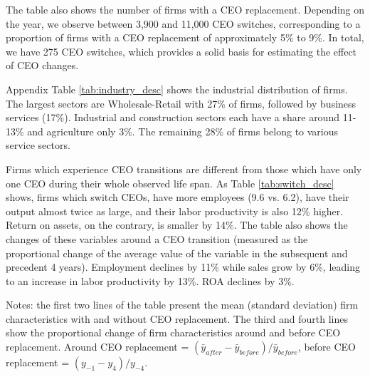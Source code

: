 \documentclass[sigconf,nonacm]{acmart}
\newcommand{\tablepath}{papers/econometrics/table}
\begin{document}
The table also shows the number of firms with a CEO replacement. Depending on the year, we observe between 3,900 and 11,000 CEO switches, corresponding to a proportion of firms with a CEO replacement of approximately 5\% to 9\%. In total, we have 275 CEO switches, which provides a solid basis for estimating the effect of CEO changes.

Appendix Table \ref{tab:industry_desc} shows the industrial distribution of firms. The largest sectors are Wholesale-Retail with 27\% of firms, followed by business services (17\%).  Industrial and construction sectors each have a share around 11-13\% and agriculture only 3\%. The remaining 28\% of firms belong to various service sectors.

Firms which experience CEO transitions are different from those which have only one CEO during their whole observed life span. As Table \ref{tab:switch_desc} shows, firms which switch CEOs, have more employees (9.6 vs. 6.2), have their output almost twice as large, and their labor productivity is also 12\% higher. Return on assets, on the contrary, is smaller by 14\%. The table also shows the changes of these variables around a CEO transition (measured as the proportional change of the average value of the variable in the subsequent and precedent 4 years). Employment declines by 11\% while sales grow by 6\%, leading to an increase in labor productivity by 13\%. ROA declines by 3\%.  
\begin{table}[t]
    \centering
    \caption{Characteristics of Firms With and Without a CEO Replacement}
    \vspace{.2cm}
    \label{tab:switch_desc}
    
    \begin{minipage}{\textwidth}
    \vspace{.2cm}
    \footnotesize{Notes: the first two lines of the table present the mean (standard deviation) firm characteristics with and without CEO replacement. The third and fourth lines show the proportional change of firm characteristics around and before CEO replacement. Around CEO replacement = $(\bar y_{after} - \bar y_{before})/\bar y_{before}$}, before CEO replacement = $(y_{-1} - y_{4})/y_{-4}$. 
    \end{minipage}
\end{table}
\end{document}
